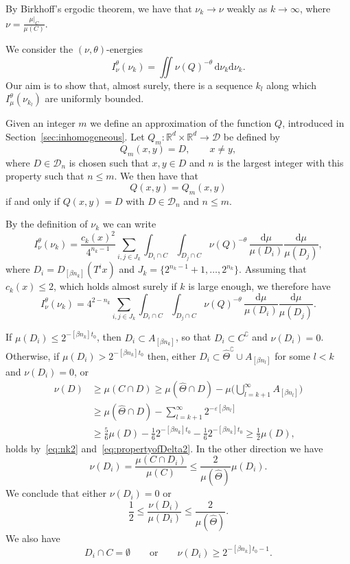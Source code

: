 \documentclass[10pt]{amsart}
\theoremstyle{definition}\newtheorem{defi}[theo]{Definition}\newtheorem{rema}[theo]{Remark}\newtheorem{exam}[theo]{Example}\newtheorem{exem}[theo]{Example}\newtheorem{nota}[theo]{Notation}
\newcommand*{\dd}{\mathrm{d}}
\begin{document}
By Birkhoff's ergodic theorem, we have that $\nu_k \to \nu$ weakly as $k \to \infty$, where $\nu = \frac{\mu|_C}{\mu (C)}$.

We consider the $(\nu, \theta)$-energies
\[
I_\nu^\theta (\nu_k) = \iint \nu (Q)^{-\theta} \, \dd \nu_k
\dd \nu_k.
\]
Our aim is to show that, almost surely, there is a sequence $k_l$ along which $I_\mu^\theta (\nu_{k_l})$ are uniformly bounded.

Given an integer $m$ we define an approximation of the function $Q$, introduced in Section~\ref{sec:inhomogeneous}. Let $Q_m \colon
\mathbb{R}^d \times \mathbb{R}^d \to \mathscr{D}$ be defined by
\[
Q_m (x,y) = D, \qquad x \neq y,
\]
where $D \in \mathscr{D}_n$ is chosen such that $x,y \in D$ and $n$ is the largest integer with this property such that $n \leq m$. We then have that
\[
Q (x,y) = Q_m (x,y)
\]
if and only if $Q (x,y) = D$ with $D \in \mathscr{D}_n$ and $n \leq m$.

By the definition of $\nu_k$ we can write
\[
I_\nu^\theta (\nu_k) = \frac{c_k (x)^2} {4^{n_k-1}} \sum_{i,j \in J_k}
\int_{D_i \cap C} \int_{D_j \cap C} \nu (Q)^{-\theta} \,
\frac{\dd \mu}{\mu (D_i)} \frac{\dd \mu}{\mu (D_j)},
\]
where $D_i = D_{[\beta n_k]} (T^i x)$ and $J_k = \{2^{n_k-1} +1,
\ldots, 2^{n_k} \}$. Assuming that $c_k (x) \leq 2$, which holds almost surely if $k$ is large enough, we therefore have
\begin{equation}\label{eq:nuenergy}
I_\nu^\theta (\nu_k) = 4^{2-n_k} \sum_{i,j \in J_k}
\int_{D_i \cap C} \int_{D_j \cap C} \nu (Q)^{-\theta} \,
\frac{\dd \mu}{\mu (D_i)} \frac{\dd \mu}{\mu (D_j)}.
\end{equation}

If $\mu (D_i) \leq 2^{-[\beta n_k] t_0}$, then $D_i \subset A_{[\beta n_k]}$, so that $D_i \subset C^\complement$ and $\nu (D_i) = 0$. Otherwise, if $\mu (D_i) > 2^{-[\beta n_k] t_0}$ then, either $D_i \subset
\hat{\Theta}^\complement \cup A_{[\beta n_l]}$ for some $l < k$ and $\nu (D_i) = 0$, or
\begin{align*}
\nu (D) &\geq \mu (C \cap D) \geq \mu (\hat{\Theta} \cap D) - \mu
\biggl(\bigcup_{l = k+1}^\infty A_{[\beta n_l]} \biggr) \\ &\geq
\mu (\hat{\Theta} \cap D) - \sum_{l=k+1}^\infty 2^{-\varepsilon [\beta n_l]} \\ &\geq \frac{5}{6} \mu (D) - \frac{1}{6} 2^{-[\beta n_k] t_0} - \frac{1}{6} 2^{-[\beta n_k] t_0} \geq \frac{1}{2}
\mu (D),
\end{align*}
holds by~\eqref{eq:nk2} and~\eqref{eq:propertyofDelta2}. In the other direction we have
\[
\nu (D_i) = \frac{\mu (C \cap D_i)}{\mu (C)} \leq \frac{2}{\mu (\hat{\Theta})} \mu (D_i).
\]
We conclude that either $\nu (D_i) = 0$ or
\begin{equation}\label{eq:mu-nu-ratio}
\frac{1}{2} \leq \frac{\nu (D_i)}{\mu (D_i)} \leq \frac{2}{\mu (\hat{\Theta})}.
\end{equation}
We also have
\begin{equation}\label{eq:nuestimate}
D_i \cap C = \emptyset \qquad \text{or} \qquad \nu (D_i) \geq 2^{-[\beta n_k] t_0 - 1}.
\end{equation}
\end{document}
